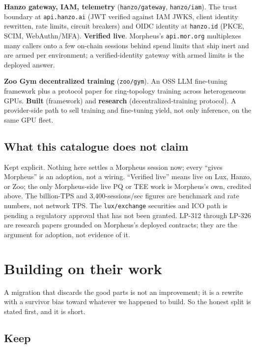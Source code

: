 \documentclass[11pt,a4paper]{article}
\newcommand{\code}[1]{\texttt{\small #1}}
\begin{document}
\textbf{Hanzo gateway, IAM, telemetry} (\code{hanzo/gateway}, \code{hanzo/iam}). The trust
boundary at \code{api.hanzo.ai} (JWT verified against IAM JWKS, client identity rewritten, rate
limits, circuit breakers) and OIDC identity at \code{hanzo.id} (PKCE, SCIM, WebAuthn/MFA).
\textbf{Verified live}. Morpheus's \code{api.mor.org} multiplexes many callers onto a few
on-chain sessions behind spend limits that ship inert and are armed per environment; a
verified-identity gateway with armed limits is the deployed answer.

\textbf{Zoo Gym decentralized training} (\code{zoo/gym}). An OSS LLM fine-tuning framework plus
a protocol paper for ring-topology training across heterogeneous GPUs. \textbf{Built}
(framework) and \textbf{research} (decentralized-training protocol). A provider-side path to
sell training and fine-tuning yield, not only inference, on the same GPU fleet.

\subsection{What this catalogue does not claim}

Kept explicit. Nothing here settles a Morpheus session now; every ``gives Morpheus'' is an
adoption, not a wiring. ``Verified live'' means live on Lux, Hanzo, or Zoo; the only
Morpheus-side live PQ or TEE work is Morpheus's own, credited above. The billion-TPS and
3,400-sessions/sec figures are benchmark and rate numbers, not network TPS. The
\code{lux/exchange} securities and ICO path is pending a regulatory approval that has not been
granted. LP-312 through LP-326 are research papers grounded on Morpheus's deployed contracts;
they are the argument for adoption, not evidence of it.

\section{Building on their work}
\label{sec:keep}

A migration that discards the good parts is not an improvement; it is a rewrite with a survivor
bias toward whatever we happened to build. So the honest split is stated first, and it is short.

\subsection{Keep}
\end{document}
